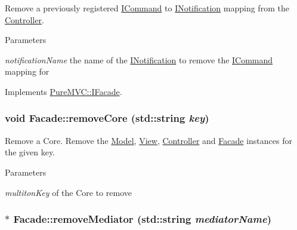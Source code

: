 Remove a previously registered {\ttfamily \hyperlink{class_pure_m_v_c_1_1_i_command}{ICommand}} to {\ttfamily \hyperlink{class_pure_m_v_c_1_1_i_notification}{INotification}} mapping from the \hyperlink{class_pure_m_v_c_1_1_controller}{Controller}. 
\begin{DoxyParams}{Parameters}
\item[{\em notificationName}]the name of the {\ttfamily \hyperlink{class_pure_m_v_c_1_1_i_notification}{INotification}} to remove the {\ttfamily \hyperlink{class_pure_m_v_c_1_1_i_command}{ICommand}} mapping for \end{DoxyParams}


Implements \hyperlink{class_pure_m_v_c_1_1_i_facade_ab102e77651cb2340c3f7387b04dc38dd}{PureMVC::IFacade}.\hypertarget{class_pure_m_v_c_1_1_facade_a78c803c55d417e9c8dd690f91543fc8c}{
\subsubsection[{removeCore}]{\setlength{\rightskip}{0pt plus 5cm}void Facade::removeCore (std::string {\em key})}}
\label{class_pure_m_v_c_1_1_facade_a78c803c55d417e9c8dd690f91543fc8c}


Remove a Core. Remove the \hyperlink{class_pure_m_v_c_1_1_model}{Model}, \hyperlink{class_pure_m_v_c_1_1_view}{View}, \hyperlink{class_pure_m_v_c_1_1_controller}{Controller} and \hyperlink{class_pure_m_v_c_1_1_facade}{Facade} instances for the given key.


\begin{DoxyParams}{Parameters}
\item[{\em multitonKey}]of the Core to remove \end{DoxyParams}
\hypertarget{class_pure_m_v_c_1_1_facade_a0ddae3c399fc7cb393596f8b13792790}{
\subsubsection[{removeMediator}]{ $\ast$ Facade::removeMediator (std::string {\em mediatorName})}}
\label{class_pure_m_v_c_1_1_facade_a0ddae3c399fc7cb393596f8b13792790}


